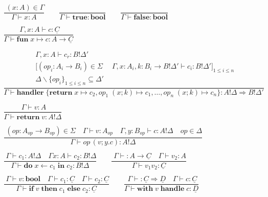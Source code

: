\documentclass{article}
\newcommand\kw[1]{\mathbf{#1}}
\newcommand\true{\kw{true}}
\newcommand\false{\kw{false}}
\newcommand\bool{\kw{bool}}
\newcommand\fun[2]{\kw{fun}\; #1 \mapsto #2}
\newcommand\handler[1]{\kw{handler}\;\{#1\}}
\newcommand\return[1]{\kw{return}\; #1}
\newcommand\op[4]{#1\;(#2; #3)\mapsto#4}
\newcommand\opcall[4]{#1\,(#2; #3. #4)}
\newcommand\seq[3]{\kw{do}\;#1 \gets #2\;\kw{in}\;#3}
\newcommand\cond[3]{\kw{if}\;#1\;\kw{then}\;#2\;\kw{else}\;#3}
\newcommand\handle[2]{\kw{with}\;#1\;\kw{handle}\;#2}
\newcommand\comp[1]{\underline{#1}}
\newcommand\judgement[2]{\dfrac{\phantom{|}#1}{#2}}
\begin{document}
\begin{gather*}
    \judgement{(x: A) \in \Gamma}{\Gamma \vdash x : A}
    \qquad
    \judgement{}{\Gamma \vdash \true : \bool}
    \qquad
    \judgement{}{\Gamma \vdash \false : \bool}
    \\\\
    \judgement{\Gamma, x: A \vdash c : \comp{C}}{\Gamma \vdash \fun{x}{c} : A \to \comp{C}}
    \\\\
    \judgement{
        \begin{gathered}
            \Gamma, x : A \vdash c_r : B ! \Delta' \\
            \big[
                (op_i : A_i \to B_i) \in \Sigma
                \quad\;
                \Gamma, x : A_i, k : B_i \to B ! \Delta' \vdash c_i : B ! \Delta'
            \big]_{1\leq i \leq n}\\
            \Delta \backslash \{op_i \}_{1\leq i \leq n} \subseteq \Delta'
        \end{gathered}
    }{
        \Gamma \vdash \handler{ \return{x} \mapsto c_2, \op{op_1}{x}{k}{c_1}, \dots, \op{op_n}{x}{k}{c_n}}: A!\Delta \Rightarrow B!\Delta'
    }
    \\\\
    \judgement{\Gamma \vdash v : A}{\Gamma \vdash \return{v} : A!\Delta}
    \\\\
    \judgement{
        (op: A_{op} \to B_{op})\in\Sigma
        \quad
        \Gamma \vdash v: A_{op}
        \quad
        \Gamma, y: B_{op} \vdash c : A!\Delta
        \quad
        op \in \Delta
    }{
        \Gamma \vdash \opcall{op}{v}{y}{c} : A!\Delta
    }
    \\\\
    \judgement{
        \Gamma \vdash c_1: A!\Delta
        \quad
        \Gamma x: A \vdash c_2 : B!\Delta
    }{
        \Gamma \vdash \seq{x}{c_1}{c_2} : B!\Delta
    }
    \qquad
    \judgement{
        \Gamma \vdash : A \to \comp{C}
        \quad
        \Gamma \vdash v_2 : A
    }{
        \Gamma \vdash v_1 v_2 : \comp{C}
    }
    \\\\
    \judgement{
        \Gamma \vdash v: \bool
        \quad
        \Gamma \vdash c_1 : \comp{C}
        \quad
        \Gamma \vdash c_2 : \comp{C}
    }{
        \Gamma \vdash \cond{v}{c_1}{c_2} : \comp{C}
    }
    \qquad
    \judgement{
        \Gamma \vdash : \comp{C} \Rightarrow \comp{D}
        \quad
        \Gamma \vdash c : \comp{C}
    }{
        \Gamma \vdash \handle{v}{c} : \comp{D}
    }
\end{gather*}
\end{document}
